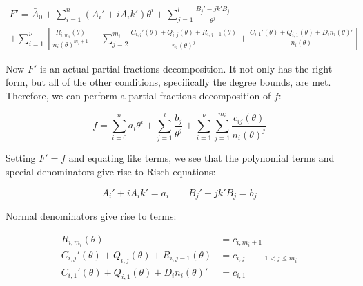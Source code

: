 \begin{comment}

\begin{multline*}
F' = \sum_{i=-l}^n (A_i' + i A_i k' )\theta^i \\
  + \sum_{i=1}^\nu \sum_{j=1}^{m_i} \frac{C_{i,j+1}'(\theta) + Q_{i,j+1}(\theta) + R_{i,j}(\theta) }{n_i(\theta)^{j+1}}
  + \sum_{i=1}^\eta \frac{C_{i,1}'(\theta) + Q_{i,1}(\theta) + D_i n_i(\theta)'}{n_i(\theta)}
\end{multline*}

\begin{multline*}
F' = \sum_{i=-l}^n (A_i' + i A_i k' )\theta^i \\
  + \sum_{i=1}^\nu \frac{R_{i,m_i}(\theta) }{n_i(\theta)^{m_i}}
  + \sum_{i=1}^\nu \sum_{j=2}^{m_i+1} \frac{C_{i,j}'(\theta) + Q_{i,j}(\theta) + R_{i,j-1}(\theta) }{n_i(\theta)^{j}}
  + \sum_{i=1}^\eta \frac{C_{i,1}'(\theta) + Q_{i,1}(\theta) + D_i n_i(\theta)'}{n_i(\theta)}
\end{multline*}

\end{comment}

\begin{multline*}
F' = \bar{A}_0 + \sum_{i=1}^n (A_i' + i A_i k' )\theta^i
  + \sum_{j=1}^{l} \frac{B_{j}' - j k' B_{j}}{\theta^j} \\
  + \sum_{i=1}^\nu \left[ \frac{R_{i,m_i}(\theta) }{n_i(\theta)^{m_i+1}}
  + \sum_{j=2}^{m_i} \frac{C_{i,j}'(\theta) + Q_{i,j}(\theta) + R_{i,j-1}(\theta) }{n_i(\theta)^{j}}
  + \frac{C_{i,1}'(\theta) + Q_{i,1}(\theta) + D_i n_i(\theta)'}{n_i(\theta)} \right]
\end{multline*}

Now $F'$ is an actual partial fractions decomposition.  It not only has
the right form, but all of the other conditions, specifically
the degree bounds, are met.
Therefore, we can perform
a partial fractions decomposition of $f$:

$$f = \sum_{i=0}^n a_i \theta^i + \sum_{j=1}^{l} \frac{b_{j}}{\theta^j}
+ \sum_{i=1}^\nu \sum_{j=1}^{m_i} \frac{c_{ij}(\theta)}{n_i(\theta)^j}$$

Setting $F' = f$ and equating like terms, we see that the polynomial terms
and special denominators give rise to Risch equations:

$$A_i' + i A_i k' = a_i  \qquad  B_{j}' - j k' B_{j} = b_j$$

Normal denominators give rise to terms:

\begin{align*}
R_{i,m_i}(\theta) & = c_{i,m_i+1} \\
C_{i,j}'(\theta) + Q_{i,j}(\theta) + R_{i,j-1}(\theta) & = c_{i,j} \qquad {}_{1<j\le m_i}\\
C_{i,1}'(\theta) + Q_{i,1}(\theta) + D_i n_i(\theta)' & = c_{i,1}
\end{align*}


